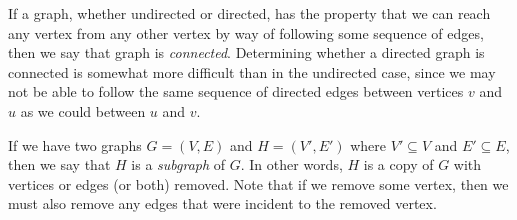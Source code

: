 \begin{example}
\begin{center}
\end{center}
\end{example}

If a graph, whether undirected or directed, has the property that we can reach any vertex from any other vertex by way of following some sequence of edges, then we say that graph is \emph{connected}. Determining whether a directed graph is connected is somewhat more difficult than in the undirected case, since we may not be able to follow the same sequence of directed edges between vertices $v$ and $u$ as we could between $u$ and $v$.

If we have two graphs $G = (V, E)$ and $H = (V', E')$ where $V' \subseteq V$ and $E' \subseteq E$, then we say that $H$ is a \emph{subgraph} of $G$. In other words, $H$ is a copy of $G$ with vertices or edges (or both) removed. Note that if we remove some vertex, then we must also remove any edges that were incident to the removed vertex.

